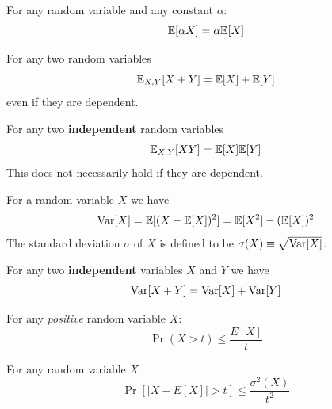 \documentclass{article}
\begin{document}
\begin{fact}%
For any random variable and any constant $\alpha$:
\begin{equation}
{\mathbb E}[\alpha X] = \alpha {\mathbb E}[X]
\end{equation}
\end{fact}

\begin{fact}%
For any two random variables
\begin{equation}
{\mathbb E}_{X,Y}[X+Y] = {\mathbb E}[X] + {\mathbb E}[Y]
\end{equation}
even if they are dependent.
\end{fact}


\begin{fact}%
For any two {\bf independent} random variables
\begin{equation}
{\mathbb E}_{X,Y}[XY] = {\mathbb E}[X]{\mathbb E}[Y]
\end{equation}
This does not necessarily hold if they are dependent.
\end{fact}

\begin{definition}[Variance]%
For a random variable $X$ we have 
\begin{equation}
{\operatorname{Var}}[X] = {\mathbb E}[(X - {\mathbb E}[X])^2] = {\mathbb E}[X^2] - ({\mathbb E}[X])^2
\end{equation}
The standard deviation $\sigma$ of $X$ is defined to be $\sigma(X) \equiv \sqrt{{\operatorname{Var}}[X]}$.
\end{definition}

\begin{definition}%
For any two {\bf independent} variables $X$ and $Y$ we have 
\begin{equation}
{\operatorname{Var}}[X + Y] = {\operatorname{Var}}[X] + {\operatorname{Var}}[Y]
\end{equation}
\end{definition}

\begin{fact}%
For any {\it positive} random variable $X$:
\begin{equation}
\Pr(X > t) \le \frac{E[X]}{t}
\end{equation}
\end{fact}

\begin{fact}%
For any random variable $X$
\begin{equation}
\Pr[|X-E[X]| > t] \le \frac{\sigma^2(X)}{t^2}
\end{equation}
\end{fact}
\end{document}
